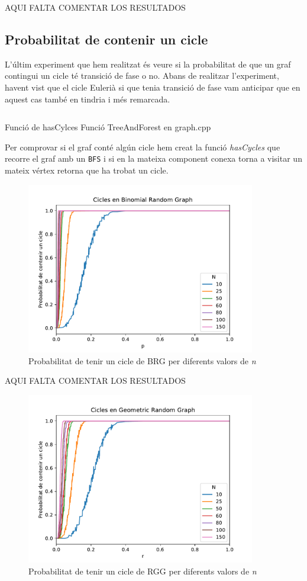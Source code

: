 AQUI FALTA COMENTAR LOS RESULTADOS

\subsection{Probabilitat de contenir un cicle}
L'últim experiment que hem realitzat és veure si la probabilitat de que un graf contingui un cicle té transició de fase o no. Abans de realitzar l'experiment, havent vist que el cicle Eulerià si que tenia transició de fase vam anticipar que en aquest cas també en tindria i més remarcada.

\begin{listing}
\inputminted[firstline=27,lastline=57]{cpp}{src/graph.cpp}
\caption{Funció de hasCylces Funció TreeAndForest en graph.cpp}
\end{listing}

Per comprovar si el graf conté algún cicle hem creat la funció \textit{hasCycles} que recorre el graf amb un \texttt{BFS} i si en la mateixa component conexa torna a visitar un mateix vértex retorna que ha trobat un cicle.

\begin{figure}[H]
    \centering
    \includegraphics[width=10cm]{plots/BRG_cicle.pdf}
    \caption{Probabilitat de tenir un cicle de BRG per diferents valors de \textit{n}}
    \label{fig:connect_04}
\end{figure}

AQUI FALTA COMENTAR LOS RESULTADOS

\begin{figure}[H]
    \centering
    \includegraphics[width=10cm]{plots/GRG_cicle.pdf}
    \caption{Probabilitat de tenir un cicle de RGG per diferents valors de \textit{n}}
    \label{fig:connect_04}
\end{figure}

